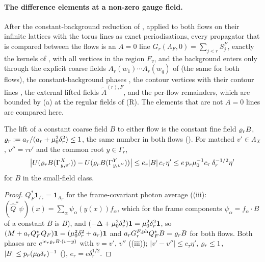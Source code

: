 
\paragraph{The difference elements at a non-zero gauge field.}
After the constant-background reduction of , applied to both flows on their infinite lattices with the torus lines as exact periodisations, every propagator that is compared between the flows is an $A=0$ line $G_r(\Lambda_F,0)=\sum_{j<r}S^F_j$, exactly the kernels of , with all vertices in the region $F_v$, and the background enters only through the explicit coarse fields $A_r(w_1)\cdots A_r(w_q)$ of \cite[(3.55)]{K1} (the same for both flows), the constant-background phases \cite[(3.46)]{K1}, the contour vertices \cite[(3.24)--(3.26)]{K1} with their contour lines \cite[(3.27)]{K1}, the external lifted fields $\tilde A^{(r),F}$, and the per-flow remainders, which are bounded by (a) at the regular fields of (R). The elements that are not $A=0$ lines are compared here.

\begin{lemma}\label{rot:hyb:lem:bph}
The lift \cite[(2.18)]{K1} of a constant coarse field $B$ to either flow is the constant fine field $\varrho_rB$, $\varrho_r:= a_r/(a_r+\mu_0^2\delta_r^2)\le1$, the same number in both flows (\cite[(3.43)]{K1}). For matched $v'\in\Lambda_X$, $v''=\tau v'$ and the common root $y\in\Gamma_r$,
\[
\big|U(\varrho_rB(\Gamma^X_{y,v'}))-U(\varrho_rB(\Gamma^Y_{y,v''}))\big|\le e_r|B|\,c_\tau\eta'\le e\,p_r\mu_0^{-1}c_\tau\,\delta_r^{-1/2}\eta'
\]
for $B$ in the small-field class.
\end{lemma}
\begin{proof}
$Q_F^*\mathbf 1_{\Gamma_r}=\mathbf 1_{\Lambda_F}$ for the frame-covariant photon average ((iii): $(\hat Q^*\psi)(x)=\sum_\alpha\psi_\alpha(y(x))f_\alpha$, which for the frame components $\psi_\alpha=f_\alpha\cdot B$ of a constant $B$ is $B$), and $(-\Delta+\mu_0^2\delta_r^2)\mathbf 1=\mu_0^2\delta_r^2\mathbf 1$, so $(M+a_rQ_F^*Q_F)\mathbf 1=(\mu_0^2\delta_r^2+a_r)\mathbf 1$ and $a_rG^{F,\mathrm{ph}}_rQ_F^*B=\varrho_rB$ for both flows. Both phases are $e^{\mathrm ie_r\varrho_rB\cdot(v-y)}$ with $v=v'$, $v''$ ((iii)); $|v'-v''|\le c_\tau\eta'$, $\varrho_r\le1$, $|B|\le p_r(\mu_0\delta_r)^{-1}$ (\cite[(3.2)]{K1}), $e_r=e\delta_r^{1/2}$.
\end{proof}

